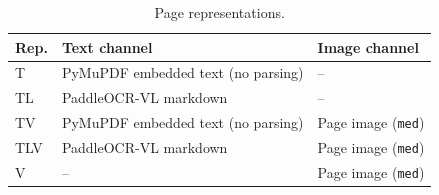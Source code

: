 \begin{table}[t]
\centering
\small
\setlength{\tabcolsep}{4pt}
\renewcommand{\arraystretch}{1.15}
\begin{tabular}{@{}l
  >{\raggedright\arraybackslash}p{}
  >{\raggedright\arraybackslash}p{}@{}}
\toprule
\textbf{Rep.} & \textbf{Text channel} & \textbf{Image channel} \\
\midrule
T   & PyMuPDF embedded text (no parsing) & -- \\
TL  & PaddleOCR-VL markdown              & -- \\
TV  & PyMuPDF embedded text (no parsing) & Page image (\texttt{med}) \\
TLV & PaddleOCR-VL markdown              & Page image (\texttt{med}) \\
V   & --                                 & Page image (\texttt{med}) \\
\bottomrule
\end{tabular}
\caption{Page representations.}
\label{tab:app_representations}
\end{table}